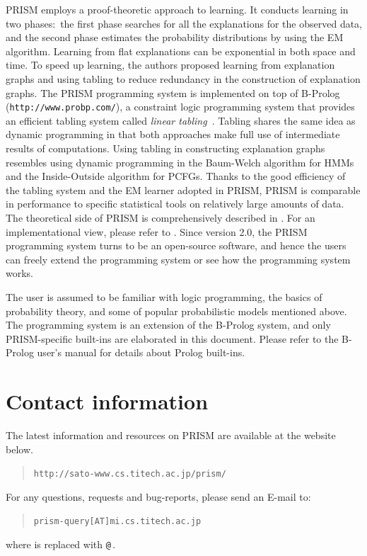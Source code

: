\documentclass[a4paper]{report}
\makeatletter
\let\tts@ve\tt
\def\tt{\tts@ve\ifmmode\def\_{\mathchar`\_}\else\def\_{\char`\_}\fi}
\makeatother
\begin{document}
PRISM employs a proof-theoretic approach to learning. It conducts learning
in two phases:\ the first phase searches for all the explanations for the
observed data, and the second phase estimates the probability distributions
by using the EM algorithm. Learning from flat explanations can be
exponential in both space and time. To speed up learning, the authors
proposed learning from explanation graphs and using tabling to reduce
redundancy in the construction of explanation graphs.  The PRISM programming
system is implemented on top of B-Prolog ({\tt http://www.probp.com/}),
a constraint logic programming system that provides
an efficient tabling system called {\em linear tabling}~\cite{Zhou03b}.
Tabling shares the same idea as dynamic programming in that
both approaches make full use of intermediate
results of computations. Using tabling in constructing explanation graphs
resembles using dynamic programming in the Baum-Welch algorithm for HMMs  and
the Inside-Outside algorithm for PCFGs. Thanks to the good efficiency of
the tabling system and the EM learner adopted in PRISM, PRISM is comparable
in performance to specific statistical tools on relatively large amounts of
data.  The theoretical side of PRISM is comprehensively described in
\cite{Sato01b}.  For an implementational view, please refer to \cite{Zhou03a}.
Since version 2.0, the PRISM programming system turns to be an open-source
software, and hence the users can freely extend the programming system or
see how the programming system works.

The user is assumed to be familiar with logic programming, the basics of
probability theory, and some of popular probabilistic models mentioned above.
The programming system is an extension of the B-Prolog system, and only
PRISM-specific built-ins are elaborated in this document. Please refer
to the B-Prolog user's manual for details about Prolog built-ins.

\section*{Contact information}
\label{contact}

The latest information and resources on PRISM are available at
the website below.
\begin{quote}
{\tt http://sato-www.cs.titech.ac.jp/prism/}
\end{quote}
For any questions, requests and bug-reports, please send an E-mail to:
\begin{quote}
{\tt prism-query[AT]mi.cs.titech.ac.jp}
\end{quote}
where {\tt [AT]} is replaced with \verb|@|\,.
\end{document}
